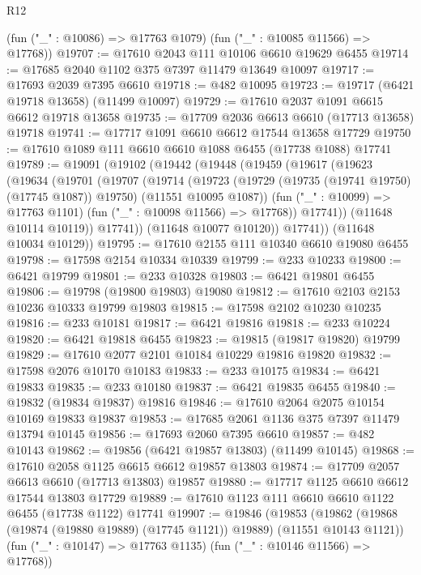 \begin{lexlean}{R12}
\begin{coremodule}
      (fun ("_" : @10086) => @17763 @1079)
      (fun ("_" : @10085 @11566) => @17768))
@19707 := @17610 @2043 @111 @10106 @6610 @19629 @6455
@19714 := @17685 @2040 @1102 @375 @7397 @11479 @13649 @10097
@19717 := @17693 @2039 @7395 @6610
@19718 := @482 @10095
@19723 := @19717 (@6421 @19718 @13658) (@11499 @10097)
@19729 := @17610 @2037 @1091 @6615 @6612 @19718 @13658
@19735 := @17709 @2036 @6613 @6610 (@17713 @13658) @19718
@19741 := @17717 @1091 @6610 @6612 @17544 @13658 @17729
@19750 := @17610 @1089 @111 @6610 @6610 @1088 @6455 (@17738 @1088) @17741
@19789 := @19091
    (@19102
      (@19442
        (@19448
          (@19459
            (@19617
              (@19623
                (@19634
                  (@19701
                    (@19707
                      (@19714
                        (@19723
                          (@19729 (@19735 (@19741 @19750) (@17745 @1087)) @19750)
                          (@11551 @10095 @1087))
                        (fun ("_" : @10099) => @17763 @1101)
                        (fun ("_" : @10098 @11566) => @17768))
                      @17741))
                  (@11648 @10114 @10119))
                @17741))
            (@11648 @10077 @10120))
          @17741))
      (@11648 @10034 @10129))
@19795 := @17610 @2155 @111 @10340 @6610 @19080 @6455
@19798 := @17598 @2154 @10334 @10339
@19799 := @233 @10233
@19800 := @6421 @19799
@19801 := @233 @10328
@19803 := @6421 @19801 @6455
@19806 := @19798 (@19800 @19803) @19080
@19812 := @17610 @2103 @2153 @10236 @10333 @19799 @19803
@19815 := @17598 @2102 @10230 @10235
@19816 := @233 @10181
@19817 := @6421 @19816
@19818 := @233 @10224
@19820 := @6421 @19818 @6455
@19823 := @19815 (@19817 @19820) @19799
@19829 := @17610 @2077 @2101 @10184 @10229 @19816 @19820
@19832 := @17598 @2076 @10170 @10183
@19833 := @233 @10175
@19834 := @6421 @19833
@19835 := @233 @10180
@19837 := @6421 @19835 @6455
@19840 := @19832 (@19834 @19837) @19816
@19846 := @17610 @2064 @2075 @10154 @10169 @19833 @19837
@19853 := @17685 @2061 @1136 @375 @7397 @11479 @13794 @10145
@19856 := @17693 @2060 @7395 @6610
@19857 := @482 @10143
@19862 := @19856 (@6421 @19857 @13803) (@11499 @10145)
@19868 := @17610 @2058 @1125 @6615 @6612 @19857 @13803
@19874 := @17709 @2057 @6613 @6610 (@17713 @13803) @19857
@19880 := @17717 @1125 @6610 @6612 @17544 @13803 @17729
@19889 := @17610 @1123 @111 @6610 @6610 @1122 @6455 (@17738 @1122) @17741
@19907 := @19846
    (@19853
      (@19862 (@19868 (@19874 (@19880 @19889) (@17745 @1121)) @19889) (@11551 @10143 @1121))
      (fun ("_" : @10147) => @17763 @1135)
      (fun ("_" : @10146 @11566) => @17768))

\end{coremodule}
\end{lexlean}
